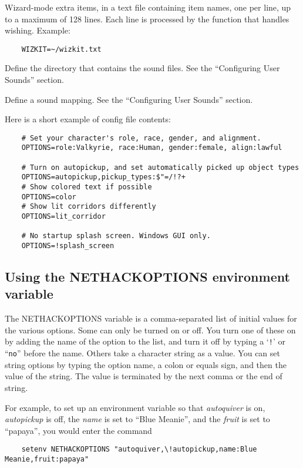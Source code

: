 \item[\bb{WIZKIT}]
Wizard-mode extra items, in a text file containing item names,
one per line, up to a maximum of 128 lines. Each line is processed
by the function that handles wishing.
Example:
\begin{verbatim}
    WIZKIT=~/wizkit.txt
\end{verbatim}
\item[\bb{SOUNDDIR}]
Define the directory that contains the sound files.
See the ``Configuring User Sounds'' section.
\item[\bb{SOUND}]
Define a sound mapping. See the ``Configuring User Sounds'' section.
\elist

Here is a short example of config file contents:
\begin{verbatim}
    # Set your character's role, race, gender, and alignment.
    OPTIONS=role:Valkyrie, race:Human, gender:female, align:lawful

    # Turn on autopickup, and set automatically picked up object types
    OPTIONS=autopickup,pickup_types:$"=/!?+
    # Show colored text if possible
    OPTIONS=color
    # Show lit corridors differently
    OPTIONS=lit_corridor

    # No startup splash screen. Windows GUI only.
    OPTIONS=!splash_screen
\end{verbatim}

\subsection*{Using the NETHACKOPTIONS environment variable}

The NETHACKOPTIONS variable is a comma-separated list of initial
values for the various options.  Some can only be turned on or off.
You turn one of these on by adding the name of the option to the list,
and turn it off by typing a `{\tt !}' or ``{\tt no}'' before the name.
Others take a
character string as a value.  You can set string options by typing
the option name, a colon or equals sign, and then the value of the string.
The value is terminated by the next comma or the end of string.

For example, to set up an environment variable so that {\it autoquiver\/}
is on, {\it autopickup\/} is off, the {\it name\/} is set to ``Blue Meanie'',
and the {\it fruit\/} is set to ``papaya'', you would enter the command
\begin{verbatim}
    setenv NETHACKOPTIONS "autoquiver,\!autopickup,name:Blue Meanie,fruit:papaya"
\end{verbatim}

